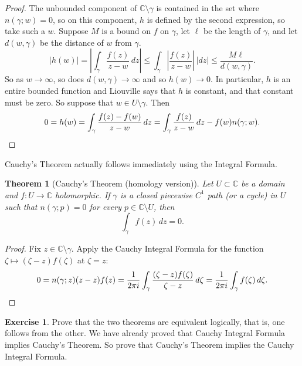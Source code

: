 \documentclass[12pt,openany]{book}
\newcommand{\sabs}[1]{\lvert {#1} \rvert}
\newcommand{\abs}[1]{\left\lvert {#1} \right\rvert}
\newcommand{\C}{{\mathbb{C}}}
\theoremstyle{plain}
\newtheorem{thm}{Theorem}[section]
\theoremstyle{remark}
\theoremstyle{definition}
\newenvironment{exbox}{%
    \def\FrameCommand{\vrule width 1pt \relax\hspace {10pt}}%
    \MakeFramed {\advance \hsize -\width \FrameRestore }%
}{%
    \endMakeFramed
}
\theoremstyle{exercise}
\newtheorem{exercise}{Exercise}[section]
\theoremstyle{example}
\begin{document}
\begin{proof}
The unbounded component of $\C \setminus \gamma$ is contained in the
set where $n(\gamma;w) = 0$, so on this component, $h$ is defined by the
second expression, so take such a $w$.
Suppose $M$ is a bound on $f$ on $\gamma$, let $\ell$ be the length of
$\gamma$, and let $d(w,\gamma)$ be the distance of $w$ from $\gamma$.
\begin{equation*}
\sabs{h(w)}
=
\abs{
\int_\gamma \frac{f(z)}{z-w} \, dz
}
\leq
\int_\gamma \abs{\frac{f(z)}{z-w}} \, \sabs{dz}
\leq
\frac{M \ell}{d(w,\gamma)} .
\end{equation*}
So as $w \to \infty$, so does $d(w,\gamma) \to \infty$ and so $h(w) \to 0$.
In particular, $h$ is an entire bounded function and
Liouville says that $h$ is constant, and that constant must be zero.
So suppose that $w \in U \setminus \gamma$.  Then
\begin{equation*}
0 = h(w) =
\int_\gamma \frac{f(z)-f(w)}{z-w} \, dz
=
\int_\gamma \frac{f(z)}{z-w} \, dz
-
f(w) n(\gamma;w) . \qedhere
\end{equation*}
\end{proof}

Cauchy's Theorem actually follows immediately using the Integral Formula.

\begin{thm}[Cauchy's Theorem (homology version)]
\label{thm:CThomology}
Let $U \subset \C$ be a domain and $f \colon U \to \C$ holomorphic.  If
$\gamma$ is a
closed
piecewise $C^1$ path (or a cycle) in $U$ such that $n(\gamma;p) = 0$ for
every $p \in \C \setminus U$, then
\begin{equation*}
\int_\gamma f(z) \, dz = 0 .
\end{equation*}
\end{thm}

\begin{proof}
Fix $z \in \C \setminus \gamma$.  Apply 
the Cauchy Integral Formula for the function $\zeta \mapsto
(\zeta-z)f(\zeta)$ at $\zeta=z$:
\begin{equation*}
0 = n(\gamma;z) (z-z)f(z) =
\frac{1}{2\pi i} \int_\gamma \frac{(\zeta-z)f(\zeta)}{\zeta-z} \, d\zeta
=
\frac{1}{2\pi i} \int_\gamma f(\zeta) \, d\zeta . \qedhere
\end{equation*}
\end{proof}

\begin{exbox}
\begin{exercise}
Prove that the two theorems are equivalent logically, that is, one follows
from the other.  We have already proved that Cauchy Integral Formula
implies Cauchy's Theorem.  So prove that
Cauchy's Theorem implies the Cauchy Integral Formula.
\end{exercise}
\end{exbox}
\end{document}
